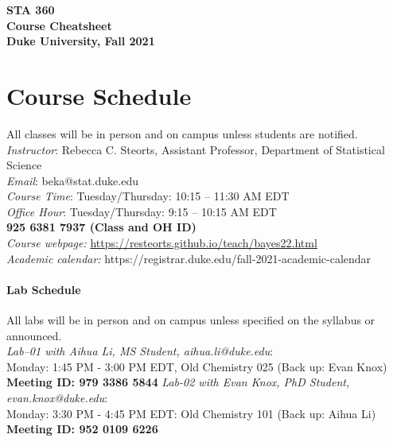 \documentclass[11pt]{article}
\date{}
\begin{document}
\begin{center}
{\Large\bf STA 360\\ Course Cheatsheet} \\

{\Large\bf Duke University, Fall 2021} \\
\end{center}


\section{Course Schedule}
All classes will be in person and on campus unless students are notified. 
\emph{Instructor}: Rebecca C. Steorts,  Assistant Professor,  Department of Statistical Science\\
\emph{Email}: beka@stat.duke.edu\\
\emph{Course Time}: Tuesday/Thursday: 10:15 -- 11:30 AM EDT \\
\emph{Office Hour}: Tuesday/Thursday: 9:15 -- 10:15 AM EDT \\
\textbf{925 6381 7937 (Class and OH ID)}\\
\emph{Course webpage:} \url{https://resteorts.github.io/teach/bayes22.html} \\
\emph{Academic calendar:} https://registrar.duke.edu/fall-2021-academic-calendar


\paragraph{Lab Schedule}
All labs will be in person and on campus unless specified on the syllabus or announced. \\
\emph{Lab--01 with Aihua Li, MS Student, aihua.li@duke.edu}: \\Monday: 1:45 PM - 3:00 PM EDT, Old Chemistry 025 (Back up: Evan Knox) \\
\textbf{Meeting ID: 979 3386 5844}
\emph{Lab-02 with Evan Knox, PhD Student, evan.knox@duke.edu}: \\Monday: 3:30 PM - 4:45 PM EDT: Old Chemistry 101 (Back up: Aihua Li) \\
\textbf{Meeting ID: 952 0109 6226}\\
\end{document}
